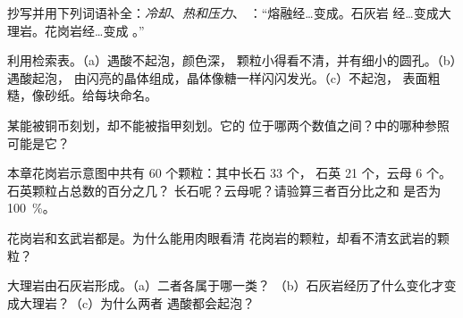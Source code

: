 \begin{exercise}[$\star$]\label{exo:g6:rocks-and-minerals:4}
抄写并用下列词语补全：\emph{冷却}、\emph{热和压力}、
\emph{}：“熔融经\ldots{}变成。石灰岩
经\ldots{}变成大理岩。花岗岩经\ldots{}变成
。”
\end{exercise}

\begin{exercise}[$\star\star$]\label{exo:g6:rocks-and-minerals:5}
利用检索表。（a）遇酸不起泡，颜色深，
颗粒小得看不清，并有细小的圆孔。（b）遇酸起泡，
由闪亮的晶体组成，晶体像糖一样闪闪发光。（c）不起泡，
表面粗糙，像砂纸。给每块命名。
\end{exercise}

\begin{exercise}[$\star\star$]\label{exo:g6:rocks-and-minerals:6}
某能被铜币刻划，却不能被指甲刻划。它的
位于哪两个数值之间？中的哪种参照
可能是它？
\end{exercise}

\begin{exercise}[$\star\star$]\label{exo:g6:rocks-and-minerals:7}
本章花岗岩示意图中共有 60 个颗粒：其中长石 33 个，
石英 21 个，云母 6 个。石英颗粒占总数的百分之几？
长石呢？云母呢？请验算三者百分比之和
是否为 100~\%。
\end{exercise}

\begin{exercise}[$\star\star$]\label{exo:g6:rocks-and-minerals:8}
花岗岩和玄武岩都是。为什么能用肉眼看清
花岗岩的颗粒，却看不清玄武岩的颗粒？
\end{exercise}

\begin{exercise}[$\star\star$]\label{exo:g6:rocks-and-minerals:9}
大理岩由石灰岩形成。（a）二者各属于哪一类？
（b）石灰岩经历了什么变化才变成大理岩？（c）为什么两者
遇酸都会起泡？
\end{exercise}

